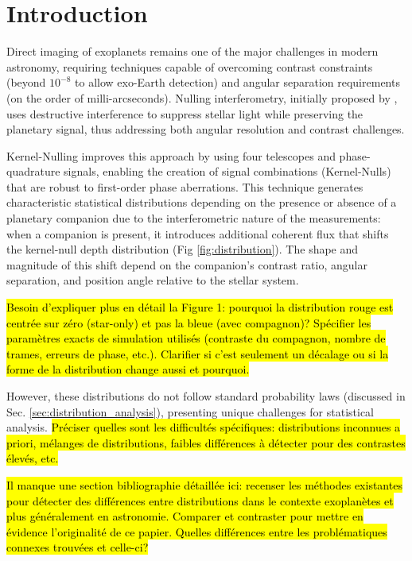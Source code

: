 \documentclass{article}
\begin{document}
\section{Introduction}

Direct imaging of exoplanets remains one of the major challenges in modern astronomy, requiring techniques capable of overcoming contrast constraints (beyond $10^{-8}$ to allow exo-Earth detection) and angular separation requirements (on the order of milli-arcseconds). Nulling interferometry, initially proposed by \cite{Bracewell1979}, uses destructive interference to suppress stellar light while preserving the planetary signal, thus addressing both angular resolution and contrast challenges.

Kernel-Nulling \cite{Martinache2018} improves this approach by using four telescopes and phase-quadrature signals, enabling the creation of signal combinations (Kernel-Nulls) that are robust to first-order phase aberrations. This technique generates characteristic statistical distributions depending on the presence or absence of a planetary companion due to the interferometric nature of the measurements: when a companion is present, it introduces additional coherent flux that shifts the kernel-null depth distribution (Fig \ref{fig:distribution}). The shape and magnitude of this shift depend on the companion's contrast ratio, angular separation, and position angle relative to the stellar system.

\hl{Besoin d'expliquer plus en détail la Figure 1: pourquoi la distribution rouge est centrée sur zéro (star-only) et pas la bleue (avec compagnon)? Spécifier les paramètres exacts de simulation utilisés (contraste du compagnon, nombre de trames, erreurs de phase, etc.). Clarifier si c'est seulement un décalage ou si la forme de la distribution change aussi et pourquoi.}

However, these distributions do not follow standard probability laws (discussed in Sec. \ref{sec:distribution_analysis}), presenting unique challenges for statistical analysis. \hl{Préciser quelles sont les difficultés spécifiques: distributions inconnues a priori, mélanges de distributions, faibles différences à détecter pour des contrastes élevés, etc.}

\hl{Il manque une section bibliographie détaillée ici: recenser les méthodes existantes pour détecter des différences entre distributions dans le contexte exoplanètes et plus généralement en astronomie. Comparer et contraster pour mettre en évidence l'originalité de ce papier. Quelles différences entre les problématiques connexes trouvées et celle-ci?}
\end{document}
